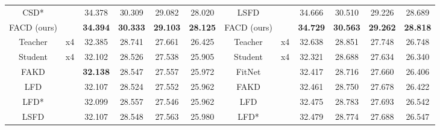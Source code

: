 \documentclass[10pt,twocolumn,letterpaper]{article}
\begin{document}
\begin{table*}[h]
{\begin{tabular}{|c|c|c|c|c|c|c|c|c|c|c|c|}
\multicolumn{1}{|c|}{CSD*}       &    & \multicolumn{1}{c|}{34.378} & \multicolumn{1}{c|}{30.309} & \multicolumn{1}{c|}{29.082} & \multicolumn{1}{c|}{28.020} & \multicolumn{1}{c|}{LSFD}        &     & \multicolumn{1}{c|}{{34.666}} & \multicolumn{1}{c|}{30.510} & \multicolumn{1}{c|}{{29.226}} & \multicolumn{1}{c|}{{28.689}}   \\ 
\multicolumn{1}{|c|}{FACD (ours)} &    & \multicolumn{1}{c|}{\textbf{34.394}} & \multicolumn{1}{c|}{\textbf{30.333}} & \multicolumn{1}{c|}{\textbf{29.103}} & \multicolumn{1}{c|}{\textbf{28.125}}   & \multicolumn{1}{c|}{FACD (ours)} &    & \multicolumn{1}{c|}{\textbf{34.729}} & \multicolumn{1}{c|}{\textbf{30.563}} & \multicolumn{1}{c|}{\textbf{29.262}} & \multicolumn{1}{c|}{\textbf{28.818}}   \\ \hline
\multicolumn{1}{|c|}{Teacher}     & \multicolumn{1}{c|}{x4}    & \multicolumn{1}{c|}{32.385} & \multicolumn{1}{c|}{28.741} & \multicolumn{1}{c|}{27.661} & \multicolumn{1}{c|}{26.425}   & \multicolumn{1}{c|}{Teacher}     & \multicolumn{1}{c|}{x4}    & \multicolumn{1}{c|}{32.638} & \multicolumn{1}{c|}{28.851} & \multicolumn{1}{c|}{27.748} & \multicolumn{1}{c|}{26.748}   \\ \hline
\multicolumn{1}{|c|}{Student}     & \multirow{7}{*}{x4}   & \multicolumn{1}{c|}{32.102} & \multicolumn{1}{c|}{28.526} & \multicolumn{1}{c|}{27.538} & \multicolumn{1}{c|}{25.905}   & \multicolumn{1}{c|}{Student}     & \multirow{7}{*}{x4}    & \multicolumn{1}{c|}{32.321} & \multicolumn{1}{c|}{28.688} & \multicolumn{1}{c|}{27.634} & \multicolumn{1}{c|}{26.340}   \\
\multicolumn{1}{|c|}{FAKD}        &    & \multicolumn{1}{c|}{\textbf{32.138}} & \multicolumn{1}{c|}{28.547} & \multicolumn{1}{c|}{27.557} & \multicolumn{1}{c|}{25.972}   & \multicolumn{1}{c|}{FitNet}      &    & \multicolumn{1}{c|}{32.417} & \multicolumn{1}{c|}{28.716} & \multicolumn{1}{c|}{27.660} & \multicolumn{1}{c|}{26.406}   \\
\multicolumn{1}{|c|}{LFD}         &     & \multicolumn{1}{c|}{32.107} & \multicolumn{1}{c|}{28.524} & \multicolumn{1}{c|}{27.552} & \multicolumn{1}{c|}{25.962}   & \multicolumn{1}{c|}{FAKD}        &    & \multicolumn{1}{c|}{32.461} & \multicolumn{1}{c|}{28.750} & \multicolumn{1}{c|}{27.678} & \multicolumn{1}{c|}{26.422}   \\
\multicolumn{1}{|c|}{LFD*}         &     & \multicolumn{1}{c|}{32.099} & \multicolumn{1}{c|}{28.557} & \multicolumn{1}{c|}{27.546} & \multicolumn{1}{c|}{25.962}   & \multicolumn{1}{c|}{LFD}         &     & \multicolumn{1}{c|}{32.475} & \multicolumn{1}{c|}{{28.783}} & \multicolumn{1}{c|}{27.693} & \multicolumn{1}{c|}{{26.542}}   \\
\multicolumn{1}{|c|}{LSFD}        &    & \multicolumn{1}{c|}{32.107} & \multicolumn{1}{c|}{28.548} & \multicolumn{1}{c|}{{27.563}} & \multicolumn{1}{c|}{{25.980}}   & \multicolumn{1}{c|}{LFD*}         &     & \multicolumn{1}{c|}{32.479} & \multicolumn{1}{c|}{{28.774}} & \multicolumn{1}{c|}{27.688} & \multicolumn{1}{c|}{{26.547}}   \\


\end{tabular}}
\end{table*}
\end{document}
